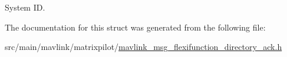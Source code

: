 System I\+D. 



The documentation for this struct was generated from the following file\+:\begin{DoxyCompactItemize}
\item 
src/main/mavlink/matrixpilot/\hyperlink{mavlink__msg__flexifunction__directory__ack_8h}{mavlink\+\_\+msg\+\_\+flexifunction\+\_\+directory\+\_\+ack.\+h}\end{DoxyCompactItemize}
